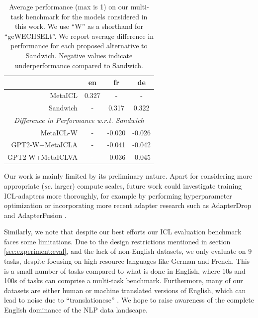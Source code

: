 \documentclass[11pt]{article}
\begin{document}
\begin{table}[ht]
	\centering
	\caption{Average performance (max is 1) on our multi-task benchmark for the models considered in
		this work. We use ``W'' as a shorthand for ``geWECHSELt''. We report average difference in
		performance for each proposed alternative to Sandwich. Negative values indicate underperformance
		compared to Sandwich.}
	\label{tab:results-summary}
	\begin{tabular}{@{}rccc@{}}
		\toprule
		\multicolumn{1}{c}{} & en    & fr     & de                             \\ \midrule
		MetaICL              & 0.327 & -      & -                              \\
		Sandwich             & -     & 0.317  & 0.322                          \\ \midrule
		\multicolumn{4}{c}{\textit{Difference in Performance w.r.t. Sandwich}} \\
		MetaICL-W            & -     & -0.020 & -0.026                         \\
		GPT2-W+MetaICLA      & -     & -0.041 & -0.042                         \\
		GPT2-W+MetaICLVA     & -     & -0.036 & -0.045                         \\ \bottomrule
	\end{tabular}
\end{table}

Our work is mainly limited by its preliminary nature. Apart for considering more appropriate
(\textit{sc.} larger) compute scales, future work could investigate training ICL-adapters more
thoroughly, for example by performing hyperparameter optimization or incorporating more recent
adapter research such as AdapterDrop \citep{ruckle_adapterdrop_2021} and AdapterFusion
\citep{pfeiffer_adapterfusion_2021}.

Similarly, we note that despite our best efforts our ICL evaluation benchmark faces some
limitations. Due to the design restrictions mentioned in section \ref{sec:experiment:eval}, and the
lack of non-English datasets, we only evaluate on 9 tasks, despite focusing on high-resource
languages like German and French. This is a small number of tasks compared to what is done in
English, where 10s and 100s of tasks can comprise a multi-task benchmark. Furthermore, many of our
datasets are either human or machine translated versions of English, which can lead to noise due to
``translationese'' \citep{koppel_translationese_2011}. We hope to raise awareness of the complete
English dominance of the NLP data landscape.
\end{document}
